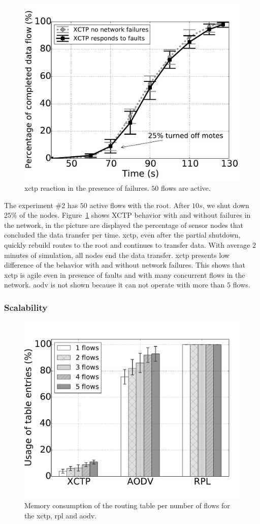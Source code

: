 \begin{figure}[t]
\centerline{
    \includegraphics[width=0.55\linewidth]{img/reacao-xctp}
} \caption{\ac{xctp} reaction in the presence of failures. $50$ flows are active.} \label{fig:reaction-xctp}
\end{figure}

The experiment \#2 has $50$ active flows with the root. After $10s$, we shut
down $25\%$ of the nodes. Figure~\ref{fig:reaction-xctp} shows XCTP behavior with and without failures in the network, in the picture are displayed the percentage of sensor nodes that concluded the data transfer per time. \ac{xctp}, even after the partial shutdown, quickly rebuild routes to the root and continues to transfer data. With average $2$ minutes of simulation, all nodes end the data transfer. \ac{xctp} presents low difference of the behavior with and without network failures. This shows that \ac{xctp} is agile even in presence of faults and with many concurrent flows in the network. \ac{aodv} is not shown because it can not operate with more than $5$ flows.

\subsubsection{Scalability}
\label{sec:scalability}

\begin{figure}[ht]
\centerline{
    \includegraphics[width=0.55\linewidth]{img/memory-xctp-aodv-rpl-bar}
} \caption{Memory consumption of the routing table per number of flows for the \ac{xctp}, \ac{rpl} and \ac{aodv}.} \label{fig:memory-xctp-aodv-rpl-bar}
\end{figure}

